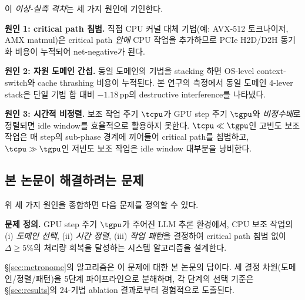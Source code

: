 이 \emph{이상-실측 격차}는 세 가지 원인에 기인한다.

\textbf{원인 1: critical path 침범.}
직접 CPU 커널 대체 기법(예: AVX-512 토크나이저, AMX matmul)은 critical path \emph{안에} CPU 작업을 추가하므로 PCIe H2D/D2H 동기화 비용이 누적되어 net-negative가 된다.

\textbf{원인 2: 자원 도메인 간섭.}
동일 도메인의 기법을 stacking 하면 OS-level context-switch와 cache thrashing 비용이 누적된다.
본 연구의 측정에서 동일 도메인 4-lever stack은 단일 기법 합 대비 $-1.18$\,pp의 destructive interference를 나타냈다.

\textbf{원인 3: 시간적 비정렬.}
보조 작업 주기 $\tcpu$가 GPU step 주기 $\tgpu$와 \emph{비정수배}로 정렬되면 idle window를 효율적으로 활용하지 못한다.
$\tcpu \ll \tgpu$인 고빈도 보조 작업은 매 step의 sub-phase 경계에 끼어들어 critical path를 침범하고, $\tcpu \gg \tgpu$인 저빈도 보조 작업은 idle window 대부분을 낭비한다.

\subsection{본 논문이 해결하려는 문제}

위 세 가지 원인을 종합하면 다음 문제를 정의할 수 있다.

\smallskip
\noindent\textbf{문제 정의.}
GPU step 주기 $\tgpu$가 주어진 LLM 추론 환경에서, CPU 보조 작업의 (i) \emph{도메인 선택}, (ii) \emph{시간 정렬}, (iii) \emph{작업 패턴}을 결정하여 critical path 침범 없이 $\Delta \geq 5\%$의 처리량 회복을 달성하는 시스템 알고리즘을 설계한다.

\smallskip

\S\ref{sec:metronome}의 \algname 알고리즘은 이 문제에 대한 본 논문의 답이다.
세 결정 차원(도메인/정렬/패턴)을 5단계 파이프라인으로 분해하며, 각 단계의 선택 기준은 \S\ref{sec:results}의 24-기법 ablation 결과로부터 경험적으로 도출된다.
